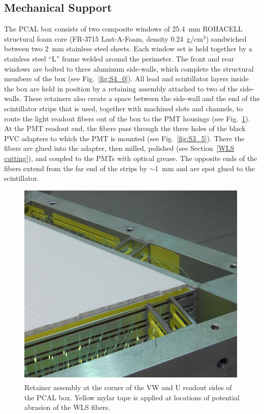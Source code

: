 \subsection{Mechanical Support}

The PCAL box consists of two composite windows of 25.4~mm ROHACELL structural foam core (FR-3715
Last-A-Foam, density 0.24~g/cm$^3$) sandwiched between two 2~mm stainless steel sheets. Each window
set is held together by a stainless steel ``L'' frame welded around the perimeter. The front and rear windows
are bolted to three aluminum side-walls, which complete the structural members of the box (see
Fig.~\ref{fig:S4_0}). All lead and scintillator layers inside the box are held in position by a retaining assembly
attached to two of the side-walls. These retainers also create a space between the side-wall and the end of the
scintillator strips that is used, together with machined slots and channels, to route the light readout fibers out
of the box to the PMT housings (see Fig.~\ref{fig:S3_6}).  At the PMT readout end, the fibers pass through the
three holes of the black PVC adapters to which the PMT is mounted (see Fig.~\ref{fig:S3_5}). There the fibers
are glued into the adapter, then milled, polished (see Section~\ref{WLS cutting}), and coupled to the PMTs with
optical grease. The opposite ends of the fibers extend from the far end of the strips by $\sim$1~mm and are
spot glued to the scintillator.   

\begin{figure}[hbt]
\centering
\includegraphics[width=0.95\columnwidth,keepaspectratio]{img/S3_6.png}
\caption[PCAL UVW Layers]{Retainer assembly at the corner of the VW and U readout sides of the PCAL box.
  Yellow mylar tape is applied at locations of potential abrasion of the WLS fibers.}
\label{fig:S3_6}
\end{figure}

